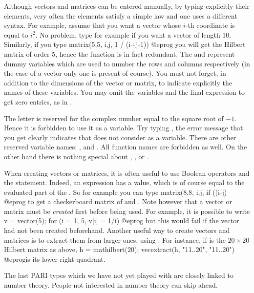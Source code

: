 Although vectors and matrices can be entered manually, by typing explicitly
their elements, very often the elements satisfy a simple law and one uses a
different syntax. For example, assume that you want a vector whose $i$-th
coordinate is equal to $i^2$. No problem, type for example
 if you want a vector of length 10. Similarly, if
you type
\bprog
  matrix(5,5, i,j, 1 / (i+j-1))
@eprog\noindent
you will get the Hilbert matrix of order 5, hence the 
function is in fact redundant.  The  and  represent dummy
variables which are used to number the rows and columns respectively (in
the case of a vector only one is present of course). You must not forget,
in addition to the dimensions of the vector or matrix, to indicate
explicitly the names of these variables. You may omit the variables and
the final expression to get zero entries, as in .

 The letter  is reserved for the complex number
equal to the square root of $-1$. Hence it is forbidden to use it as a
variable. Try typing , the error message that you
get clearly indicates that  does not consider  as a variable.
There are other reserved variable names: ,  and
. All function names are forbidden as well. On the other hand
there is nothing special about , ,  or .

When creating vectors or matrices, it is often useful to use Boolean
operators and the  statement. Indeed, an  expression has a
value, which is of course equal to the evaluated part of the . So for
example you can type
\bprog
  matrix(8,8, i,j, if ((i-j)%
@eprog\noindent
to get a checkerboard matrix of  and . Note however
that a vector or matrix must be \emph{created} first before being used. For
example, it is possible to write
\bprog
  v = vector(5);
  for (i = 1, 5, v[i] = 1/i)
@eprog\noindent
but this would fail if the vector  had not been created beforehand.
Another useful way to create vectors and matrices is to extract them from
larger ones, using . For instance, if  is the
$20\times 20$ Hilbert matrix as above,
\bprog
  h = mathilbert(20);
  vecextract(h, "11..20", "11..20")
@eprog\noindent is its lower right quadrant.

\medskip The last PARI types which we have not yet played with are closely
linked to number theory. People not interested in number theory can skip
ahead.

